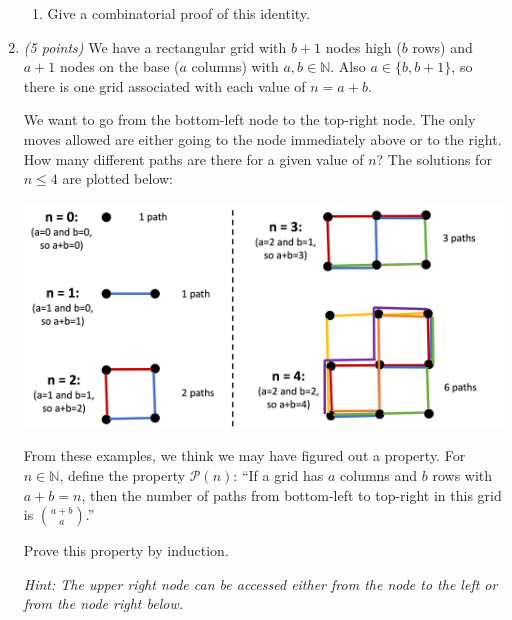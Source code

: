 \documentclass[12pt]{article}
\begin{document}
\begin{enumerate}
\begin{enumerate}

\item Give a combinatorial proof of this identity. \newline


\end{enumerate}

\item \emph{(5 points)} We have a rectangular grid with \( b+1 \) nodes high (\( b \) rows) and \( a+1 \) nodes on the base (\( a \) columns) with \( a, b \in \mathbb{N} \). Also \( a \in \{ b, b+1 \} \), so there is one grid associated with each value of \( n = a + b \). 

We want to go from the bottom-left node to the top-right node. The only moves allowed are either going to the node immediately above or to the right. 
How many different paths are there for a given value of \( n \)? The solutions for \( n \leq 4 \) are plotted below:

\includegraphics[width=\textwidth]{./qIII_paths.png}

From these examples, we think we may have figured out a property. For \( n \in \mathbb{N} \), define the property \( \mathcal{P}(n) \): ``If a grid has \( a \) columns and \( b \) rows with \( a + b = n \), then the number of paths from bottom-left to top-right in this grid is \( \binom{a+b}{a} \).''

Prove this property by induction.

\emph{Hint: The upper right node can be accessed either from the node to the left or from the node right below.} \newline



\end{enumerate}
\newpage %
\end{document}
